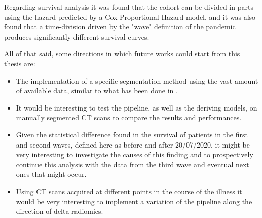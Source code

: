 Regarding survival analysis it was found that the cohort can be divided in parts using the hazard predicted by a Cox Proportional Hazard model, and it was also found that a time-division driven by the "wave" definition of the pandemic produces significantly different survival curves.

All of that said, some directions in which future works could start from this thesis are:

\begin{itemize}
\item The implementation of a \covid specific segmentation method using the vast amount of available data, similar to what has been done in \cite{Biondi}.
\item It would be interesting to test the pipeline, as well as the deriving models, on manually segmented CT scans to compare the results and performances.
\item Given the statistical difference found in the survival of patients in the first and second waves, defined here as before and after 20/07/2020, it might be very interesting to investigate the causes of this finding and to prospectively continue this analysis with the data from the third wave and eventual next ones that might occur.
\item Using CT scans acquired at different points in the course of the illness it would be very interesting to implement a variation of the pipeline along the direction of delta-radiomics.
\end{itemize}
